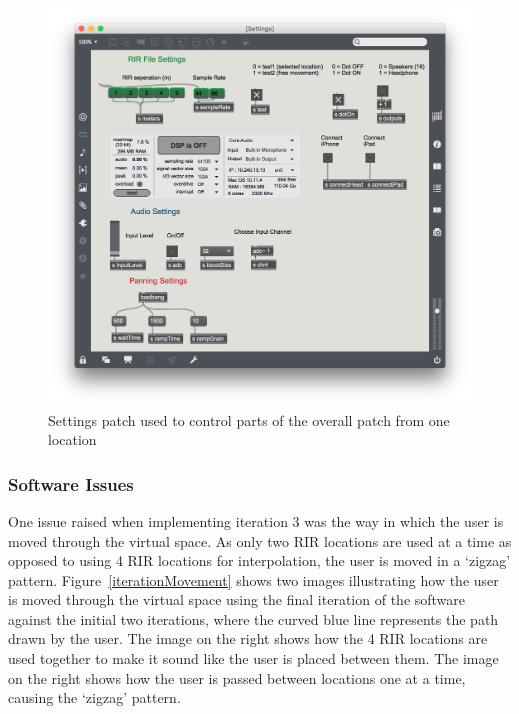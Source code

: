 \documentclass[../../main.tex]{subfiles}
\begin{document}
		\begin{figure}[H]
			\centerline{\includegraphics[scale = 0.4]{Sections/Implementation/Max/images/settings.png}}
			\caption{Settings patch used to control parts of the overall patch from one location}
			\label{settings}
		\end{figure}

		\subsubsection{Software Issues}
	\label{iteration3Issues}


	One issue raised when implementing iteration 3 was the way in which the user is moved through the virtual space. As only two \ac{RIR} locations are used at a time as opposed to using 4 \ac{RIR} locations for interpolation, the user is moved in a `zigzag' pattern. Figure~\ref{iterationMovement} shows two images illustrating how the user is moved through the virtual space using the final iteration of the software against the initial two iterations, where the curved blue line represents the path drawn by the user. The image on the right shows how the 4 \ac{RIR} locations are used together to make it sound like the user is placed between them. The image on the right shows how the user is passed between locations one at a time, causing the `zigzag' pattern.
\end{document}
